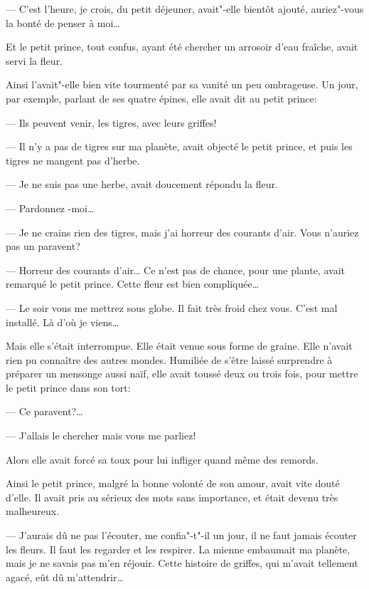 \begin{Parallel}[p]{}{}
{--- C'est l'heure, je crois, du petit déjeuner, avait"-elle bientôt ajouté, auriez"-vous la bonté de penser à moi\ldots{}

Et le petit prince, tout confus, ayant été chercher
un arrosoir d'eau fraîche, avait servi la fleur.

\medskip

Ainsi l'avait"-elle bien vite tourmenté par sa vanité un peu ombrageuse.
Un jour, par exemple, parlant de ses quatre épines,
elle avait dit au petit prince:

--- Ils peuvent venir, les tigres, avec leurs griffes!

--- Il n'y a pas de tigres sur ma planète, avait
objecté le petit prince, et puis les tigres ne mangent
pas d'herbe.

--- Je ne suis pas une herbe, avait doucement répondu la fleur.

--- Pardonnez -moi\ldots{}

--- Je ne crains rien des tigres, mais j'ai horreur
des courants d'air. Vous n'auriez pas un paravent?

--- Horreur des courants d'air\ldots{} Ce n'est pas de
chance, pour une plante, avait remarqué le petit
prince. Cette fleur est bien compliquée\ldots{}

--- Le soir vous me mettrez sous globe. Il fait très froid chez vous.
C'est mal installé. Là d'où je viens\ldots{}

Mais elle s'était interrompue. Elle était venue sous
forme de graine. Elle n'avait rien pu connaître des autres mondes.
Humiliée de s'être laissé surprendre à préparer un mensonge aussi naïf, elle avait toussé
deux ou trois fois, pour mettre le petit prince dans son tort:

--- Ce paravent?\ldots{}

--- J'allais le chercher mais vous me parliez!

Alors elle avait forcé sa toux pour lui infliger
quand même des remords.

\medskip

Ainsi le petit prince, malgré la bonne volonté de
son amour, avait vite douté d'elle. Il avait pris au
sérieux des mots sans importance, et était devenu
très malheureux.

--- J'aurais dû ne pas l'écouter, me confia"-t"-il un
jour, il ne faut jamais écouter les fleurs. Il faut les
regarder et les respirer. La mienne embaumait ma
planète, mais je ne savais pas m'en réjouir. Cette histoire de griffes, qui m'avait tellement agacé, eût dû
m'attendrir\ldots{}

}
\end{Parallel}
